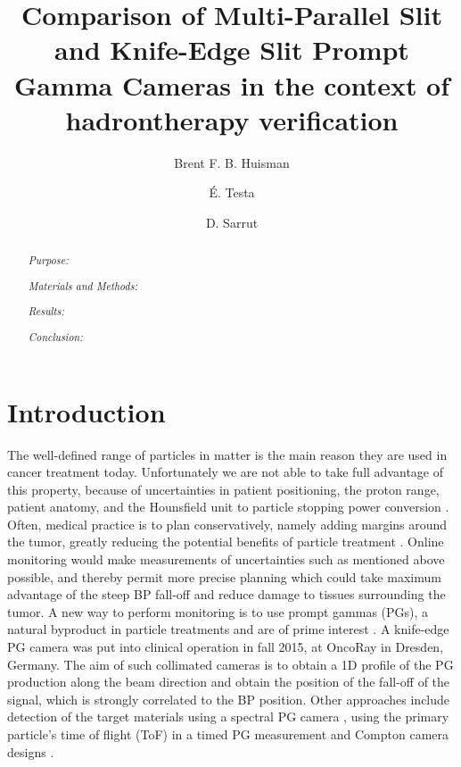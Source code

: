 \documentclass[a4paper,english]{article}
\begin{document}
\title{Comparison of Multi-Parallel Slit and Knife-Edge Slit Prompt Gamma Cameras in the context of hadrontherapy verification}

\author[1,2]{Brent F. B. Huisman}
\author[2]{\'E. Testa}
\author[1]{D. Sarrut}

\maketitle

\begin{abstract}

\emph{Purpose:} 

\emph{Materials and Methods:} 

\emph{Results:} 

\emph{Conclusion:} 

\end{abstract}

\tableofcontents

\newpage

\section{Introduction}

The well-defined range of particles in matter is the main reason they are used in cancer treatment today. Unfortunately we are not able to take full advantage of this property, because of uncertainties in patient positioning, the proton range, patient anatomy, and the Hounsfield unit to particle stopping power conversion \citep{Paganetti2012}. Often, medical practice is to plan conservatively, namely adding margins around the tumor, greatly reducing the potential benefits of particle treatment \citep{Knopf2013}. Online monitoring would make measurements of uncertainties such as mentioned above possible, and thereby permit more precise planning which could take maximum advantage of the steep BP fall-off and reduce damage to tissues surrounding the tumor. A new way to perform monitoring is to use prompt gammas (PGs), a natural byproduct in particle treatments and are of prime interest \citep{Moteabbed2011,Gueth2013,Golnik2014a,Janssen2014}. A knife-edge PG camera \citep{Perali2014,Richter2016} was put into clinical operation in fall 2015, at OncoRay in Dresden, Germany. The aim of such collimated cameras is to obtain a 1D profile of the PG production along the beam direction and obtain the position of the fall-off of the signal, which is strongly correlated to the BP position. Other approaches include detection of the target materials using a spectral PG camera \citep{Verburg2014}, using the primary particle's time of flight (ToF) in a timed PG measurement \citep{Golnik2014a} and Compton camera designs \citep{Roellinghoff2011,Kurosawa2012,Solevi2016,Thirolf2016,Polf2015,Llosa2016}.
\end{document}

